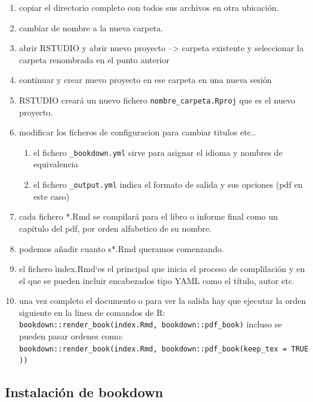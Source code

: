 \documentclass[10pt,spanish,a4paper,oneside]{article}
\providecommand{\tightlist}{%
  \setlength{\itemsep}{0pt}\setlength{\parskip}{0pt}}
\begin{document}
\begin{enumerate}
\def\labelenumi{\arabic{enumi}.}
\tightlist
\item
  copiar el directorio completo con todos sus archivos en otra
  ubicación.
\item
  cambiar de nombre a la nueva carpeta.
\item
  abrir RSTUDIO y abrir nuevo proyecto --\textgreater{} carpeta
  existente y seleccionar la carpeta renombrada en el punto anterior
\item
  continuar y crear nuevo proyecto en ese carpeta en una nueva sesión
\item
  RSTUDIO creará un nuevo fichero \texttt{nombre\_carpeta.Rproj} que es
  el nuevo proyecto.
\item
  modificar los ficheros de configuracion para cambiar titulos etc..

  \begin{enumerate}
  \def\labelenumii{\arabic{enumii}.}
  \tightlist
  \item
    el fichero \texttt{\_bookdown.yml} sirve para asignar el idioma y
    nombres de equivalencia
  \item
    el fichero \texttt{\_output.yml} indica el formato de salida y sus
    opciones (pdf en este caso)
  \end{enumerate}
\item
  cada fichero *.Rmd se compilará para el libro o informe final como un
  capitulo del pdf, por orden alfabetico de su nombre.
\item
  podemos añadir cuanto s*.Rmd queramos comenzando.
\item
  el fichero ìndex.Rmd`es el principal que inicia el proceso de
  complilación y en el que se pueden incluir encabezados tipo YAML como
  el título, autor etc.
\item
  una vez completo el documento o para ver la salida hay que ejecutar la
  orden siguiente en la linea de comandos de R:
  \texttt{bookdown::render\_book(\textquotesingle{}index.Rmd\textquotesingle{},\ \textquotesingle{}bookdown::pdf\_book\textquotesingle{})}
  incluso se pueden pasar ordenes como:
  \texttt{bookdown::render\_book(\textquotesingle{}index.Rmd\textquotesingle{},\ bookdown::pdf\_book(keep\_tex\ =\ TRUE))}
\end{enumerate}

\subsection{Instalación de bookdown}\label{instalacion-de-bookdown}
\end{document}
